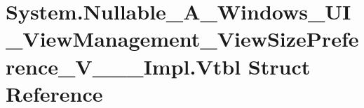 \hypertarget{struct_system_1_1_nullable___a___windows___u_i___view_management___view_size_preference___v_______impl_1_1_vtbl}{}\section{System.\+Nullable\+\_\+\+A\+\_\+\+Windows\+\_\+\+U\+I\+\_\+\+View\+Management\+\_\+\+View\+Size\+Preference\+\_\+\+V\+\_\+\+\_\+\+\_\+\+Impl.\+Vtbl Struct Reference}
\label{struct_system_1_1_nullable___a___windows___u_i___view_management___view_size_preference___v_______impl_1_1_vtbl}
